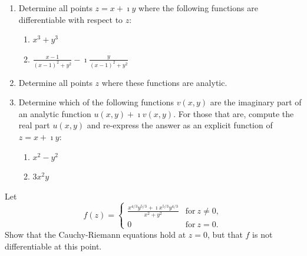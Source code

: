 {%
\begin{Exercise}
  \label{exercise diff x3f3}
  \begin{enumerate}
  \item
    Determine all points $z = x + \imath y$ where the following functions are 
    differentiable with respect to $z$:
    \begin{enumerate}
    \item 
      $\displaystyle x^3 + y^3$
    \item 
      $\displaystyle \frac{x - 1}{(x - 1)^2 + y^2} - \imath \frac{y}{(x - 1)^2 + y^2}$
    \end{enumerate}
  \item 
    Determine all points $z$ where these functions are analytic.
  \item 
    Determine which of the following functions $v(x, y)$ are the 
    imaginary part of an analytic function $u(x, y) + \imath v(x, y)$.  For 
    those that are, compute the real part $u(x, y)$ and re-express the answer
    as an explicit function of $z = x + \imath y$:
    \begin{enumerate}
    \item 
      $x^2 - y^2$
    \item 
      $3 x^2 y$
    \end{enumerate}
  \end{enumerate}

\end{Exercise}









\begin{Exercise}
  \label{exercise C-R x43y53}
  Let
  \[
  f(z) = 
  \begin{cases}
    \frac{ x^{4/3} y^{5/3} + \imath x^{5/3} y^{4/3} }{ x^2 + y^2 } &\mathrm{for}\ z \neq 0, 
    \\
    0       &\mathrm{for}\ z = 0.
  \end{cases}
  \]
  Show that the Cauchy-Riemann equations hold at $z = 0$, but that $f$ is
  not differentiable at this point.

\end{Exercise}





}
